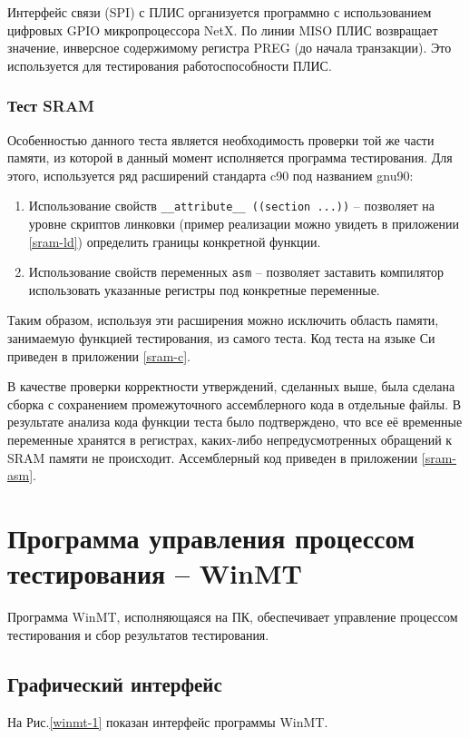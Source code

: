 \documentclass[a4paper,14pt,bachelor]{disser}
\begin{document}
Интерфейс связи (SPI) с ПЛИС организуется программно с использованием цифровых GPIO микропроцессора NetX. По линии MISO ПЛИС возвращает значение, инверсное содержимому регистра PREG (до начала транзакции). Это используется для тестирования работоспособности ПЛИС.

\subsubsection{Тест SRAM}
Особенностью данного теста является необходимость проверки той же части памяти, из которой в данный момент исполняется программа тестирования. Для этого, используется ряд расширений стандарта c90 под названием gnu90:

\begin{enumerate}
 \item Использование свойств \verb|__attribute__ ((section ...))| -- позволяет на уровне скриптов линковки (пример реализации можно увидеть в приложении \ref{sram-ld}) определить границы конкретной функции.
 \item Использование свойств переменных \verb|asm| -- позволяет заставить компилятор использовать указанные регистры под конкретные переменные.
\end{enumerate}

Таким образом, используя эти расширения можно исключить область памяти, занимаемую функцией тестирования, из самого теста. Код теста на языке Си приведен в приложении \ref{sram-c}.

В качестве проверки корректности утверждений, сделанных выше, была сделана сборка с сохранением промежуточного ассемблерного кода в отдельные файлы. В результате анализа кода функции теста было подтверждено, что все её временные переменные хранятся в регистрах, каких-либо непредусмотренных обращений к SRAM памяти не происходит. Ассемблерный код приведен в приложении \ref{sram-asm}.

\section{Программа управления процессом тестирования -- WinMT}
Программа WinMT, исполняющаяся на ПК, обеспечивает управление процессом тестирования и сбор результатов тестирования.

\subsection{Графический интерфейс}
На Рис.\ref{winmt-1} показан интерфейс программы WinMT.
\end{document}
